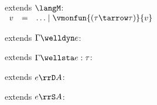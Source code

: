 \begin{flushleft}

 extends $\langM$:\\
$\begin{array}{l c l}
  v & = & \ldots \mid \vmonfun{(\tau\tarrow\tau)}{v}
\end{array}$

\medskip
\begin{minipage}[t]{0.5\textwidth}
 extends $\Gamma \welldyn e$:
\begin{mathpar}
\end{mathpar}
\end{minipage}%
\begin{minipage}[t]{0.5\textwidth}
 extends $\Gamma \wellsta e : \tau$:
\begin{mathpar}
\end{mathpar}
\end{minipage}

\medskip
\begin{minipage}[t]{0.5\textwidth}
 extends $e \rrD A$:
\begin{mathpar}
\end{mathpar}
\end{minipage}%
\begin{minipage}[t]{0.5\textwidth}
 extends $e \rrS A$:
\begin{mathpar}
\end{mathpar}
\end{minipage}%

\medskip
{}
\begin{mathpar}


\end{mathpar}
\end{flushleft}

